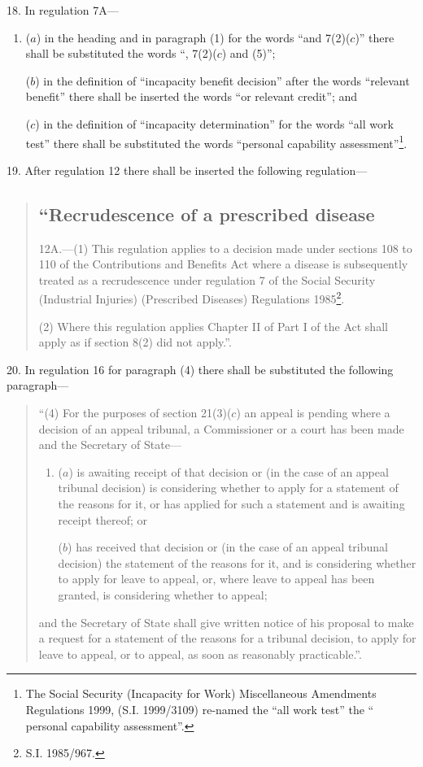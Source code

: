 \documentclass[12pt,a4paper]{article}
\begin{document}
\medskip

18.  In regulation 7A—
\begin{enumerate}\item[]
($a$) in the heading and in paragraph (1) for the words “and 7(2)($c$)” there shall be substituted the words “, 7(2)($c$)  and (5)”;

($b$) in the definition of “incapacity benefit decision” after the words “relevant benefit” there shall be inserted the words “or relevant credit”; and

($c$) in the definition of “incapacity determination” for the words “all work test” there shall be substituted the words “personal capability assessment”\footnote{\frenchspacing The Social Security (Incapacity for Work) Miscellaneous Amendments Regulations 1999, (S.I. 1999/3109) re-named the “all work test” the “ personal capability assessment”.}.
\end{enumerate}

\medskip

19.  After regulation 12 there shall be inserted the following regulation—
\begin{quotation}
\subsection*{“Recrudescence of a prescribed disease}

12A.---(1)  This regulation applies to a decision made under sections 108 to 110 of the Contributions and Benefits Act where a disease is subsequently treated as a recrudescence under regulation 7 of the Social Security (Industrial Injuries) (Prescribed Diseases) Regulations 1985\footnote{\frenchspacing S.I. 1985/967.}.

(2) Where this regulation applies Chapter II of Part I of the Act shall apply as if section 8(2) did not apply.”.
\end{quotation}

\medskip

20.  In regulation 16 for paragraph (4) there shall be substituted the following paragraph—
\begin{quotation}
“(4) For the purposes of section 21(3)($c$)  an appeal is pending where a decision of an appeal tribunal, a Commissioner or a court has been made and the Secretary of State—
\begin{enumerate}\item[]
($a$) is awaiting receipt of that decision or (in the case of an appeal tribunal decision) is considering whether to apply for a statement of the reasons for it, or has applied for such a statement and is awaiting receipt thereof; or

($b$) has received that decision or (in the case of an appeal tribunal decision) the statement of the reasons for it, and is considering whether to apply for leave to appeal, or, where leave to appeal has been granted, is considering whether to appeal;
\end{enumerate}
and the Secretary of State shall give written notice of his proposal to make a request for a statement of the reasons for a tribunal decision, to apply for leave to appeal, or to appeal, as soon as reasonably practicable.”.
\end{quotation}
\end{document}
